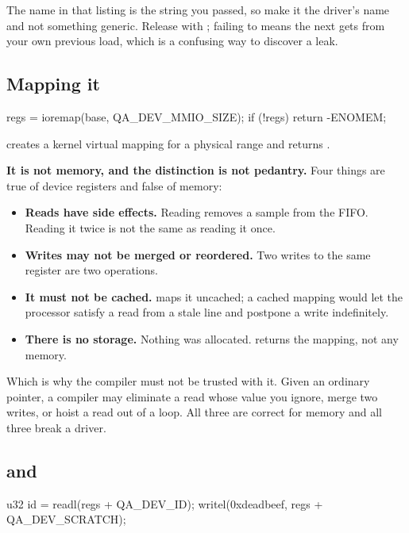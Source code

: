 \noindent The name in that listing is the string you passed, so make it the driver's name and not
something generic. Release with ; failing to means the next
 gets  from your own previous load, which is a confusing way to discover a
leak.

\subsection{Mapping it}
\label{c6:app:b3}

\begin{ccode}
regs = ioremap(base, QA_DEV_MMIO_SIZE);
if (!regs)
        return -ENOMEM;
\end{ccode}

\noindent {} creates a kernel virtual mapping for a physical range and returns
.

\textbf{It is not memory, and the distinction is not pedantry.} Four things are true of device
registers and false of memory:
\begin{itemize}
  \item \textbf{Reads have side effects.} Reading  removes a sample from the
    FIFO. Reading it twice is not the same as reading it once.
  \item \textbf{Writes may not be merged or reordered.} Two writes to the same register are two
    operations.
  \item \textbf{It must not be cached.}  maps it uncached; a cached mapping would let
    the processor satisfy a read from a stale line and postpone a write indefinitely.
  \item \textbf{There is no storage.} Nothing was allocated.  returns the mapping, not
    any memory.
\end{itemize}
Which is why the compiler must not be trusted with it. Given an ordinary pointer, a compiler may
eliminate a read whose value you ignore, merge two writes, or hoist a read out of a loop. All three
are correct for memory and all three break a driver.

\subsection{ and }
\label{c6:app:b4}

\begin{ccode}
u32 id = readl(regs + QA_DEV_ID);
writel(0xdeadbeef, regs + QA_DEV_SCRATCH);
\end{ccode}

